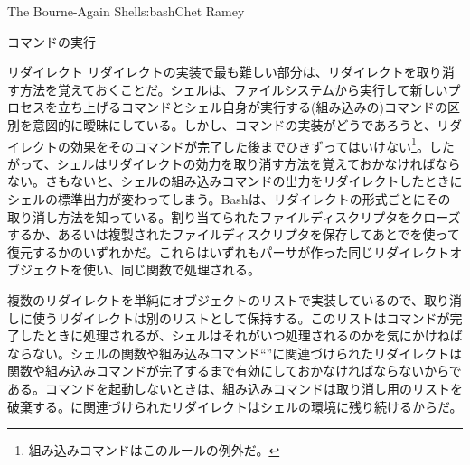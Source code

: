 \begin{aosachapter}{The Bourne-Again Shell}{s:bash}{Chet Ramey}
\begin{aosasect1}{コマンドの実行}
\begin{aosasect2}{リダイレクト}
リダイレクトの実装で最も難しい部分は、リダイレクトを取り消す方法を覚えておくことだ。シェルは、ファイルシステムから実行して新しいプロセスを立ち上げるコマンドとシェル自身が実行する(組み込みの)コマンドの区別を意図的に曖昧にしている。しかし、コマンドの実装がどうであろうと、リダイレクトの効果をそのコマンドが完了した後までひきずってはいけない\footnote{組み込みコマンドはこのルールの例外だ。}。したがって、シェルはリダイレクトの効力を取り消す方法を覚えておかなければならない。さもないと、シェルの組み込みコマンドの出力をリダイレクトしたときにシェルの標準出力が変わってしまう。Bashは、リダイレクトの形式ごとにその取り消し方法を知っている。割り当てられたファイルディスクリプタをクローズするか、あるいは複製されたファイルディスクリプタを保存してあとでを使って復元するかのいずれかだ。これらはいずれもパーサが作った同じリダイレクトオブジェクトを使い、同じ関数で処理される。

複数のリダイレクトを単純にオブジェクトのリストで実装しているので、取り消しに使うリダイレクトは別のリストとして保持する。このリストはコマンドが完了したときに処理されるが、シェルはそれがいつ処理されるのかを気にかけねばならない。シェルの関数や組み込みコマンド``''に関連づけられたリダイレクトは関数や組み込みコマンドが完了するまで有効にしておかなければならないからである。コマンドを起動しないときは、組み込みコマンドは取り消し用のリストを破棄する。に関連づけられたリダイレクトはシェルの環境に残り続けるからだ。


\end{aosasect2}
\end{aosasect1}
\end{aosachapter}
